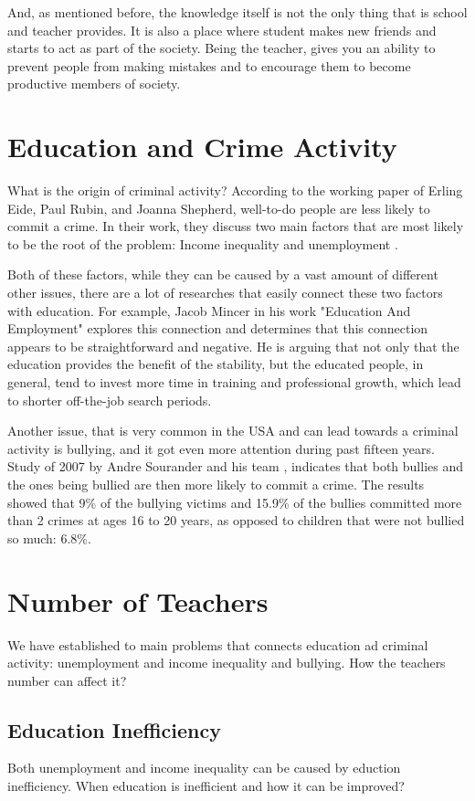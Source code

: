 \documentclass[thesis=B,english]{FITthesis}[2012/10/20]
\begin{document}
And, as mentioned before, the knowledge itself is not the only thing that is school and teacher provides. It is also a place where student makes new friends and starts to act as part of the society. Being the teacher, gives you an ability  to prevent people from making mistakes and to encourage them to become productive members of society.


\section{Education and Crime Activity}
What is the origin of criminal activity? According to the working paper of Erling Eide, Paul Rubin, and  Joanna Shepherd, well-to-do people are less likely to commit a crime.  In their work, they discuss two main factors that are most likely to be the root of the problem: Income inequality and unemployment \cite{crimeeco}.

Both of these factors, while they can be caused by a vast amount of different other issues, there are a lot of researches that easily connect these two factors with education. For example, Jacob Mincer in his work "Education And Employment" \cite{employment} explores this connection and determines that this connection appears to be straightforward and negative. He is arguing that not only that the education provides the benefit of the stability, but the educated people, in general, tend to invest more time in training and professional growth, which lead to shorter off-the-job search periods.

Another issue, that is very common in the USA and can lead towards a criminal activity is bullying, and it got even more attention during past fifteen years. Study of 2007 by Andre Sourander and his team \cite{bulying}, indicates that both bullies and the ones being bullied are then more likely to commit a crime. The results showed that 9\% of the bullying victims and 15.9\% of the bullies committed more than 2 crimes at ages 16 to 20 years, as opposed to children that were not bullied so much: 6.8\%.



\section{Number of Teachers}
We have established to main problems that connects education ad criminal activity: unemployment and income inequality and bullying. How the teachers number can affect it?

\subsection{Education Inefficiency}
Both unemployment and income inequality can be caused by eduction inefficiency. When education is inefficient and how it can be improved?
\end{document}
